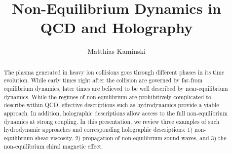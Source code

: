 \documentclass[preprint,12pt]{elsarticle}
\begin{document}
\begin{frontmatter}



\title{Non-Equilibrium Dynamics in QCD and Holography}


\author{Matthias Kaminski} %


\begin{abstract}
The plasma generated in heavy ion collisions goes through different phases in its time evolution. While early times right after the collision are governed by far-from equilibrium dynamics, later times are believed to be well described by near-equilibrium dynamics. While the regimes of non-equilibrium are prohibitively complicated to describe within QCD, effective descriptions such as hydrodynamics provide a viable approach. In addition, holographic descriptions allow access to the full non-equilibrium dynamics at strong coupling. In this presentation, we review three examples of such hydrodynamic approaches and corresponding holographic descriptions: 1) non-equilibrium shear viscosity, 2) propagation of non-equilibrium sound waves, and 3) the non-equilibrium chiral magnetic effect.
\end{abstract}


\end{frontmatter}
\end{document}
